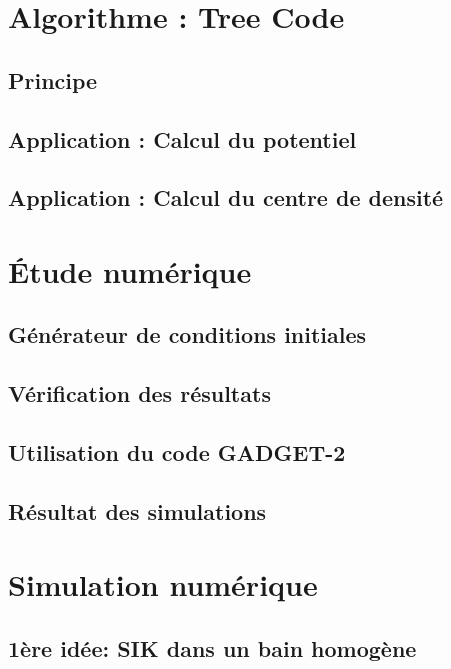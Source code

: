 \chapter{Algorithme : Tree Code}
	\minitoc
	\section{Principe}
		
	\section{Application : Calcul du potentiel}
		
	\section{Application : Calcul du centre de densité}
		
	\FloatBarrier

\chapter{Étude numérique}
	\minitoc
	\section{Générateur de conditions initiales}
		
	\section{Vérification des résultats\label{Verif_gene}} %
		
	\section{Utilisation du code \textsc{GADGET-2}}
		
	\section{Résultat des simulations}
		

\chapter{Simulation numérique}
	\minitoc
	\section[1ère idée]{1ère idée: SIK dans un bain homogène}
		
